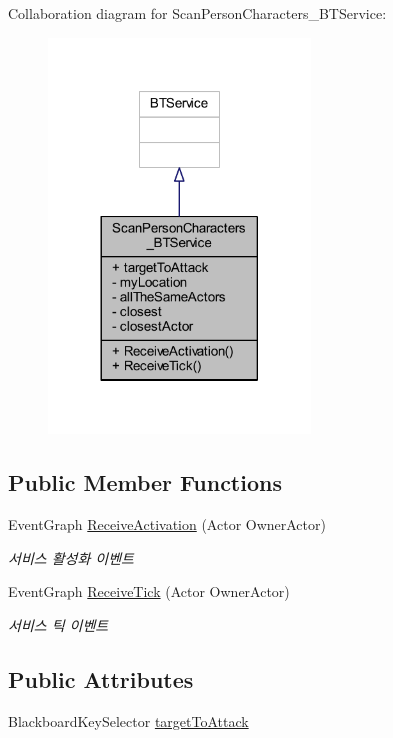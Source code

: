 Collaboration diagram for Scan\+Person\+Characters\+\_\+\+B\+T\+Service\+:
\nopagebreak
\begin{figure}[H]
\begin{center}
\leavevmode
\includegraphics[width=197pt]{class_scan_person_characters___b_t_service__coll__graph}
\end{center}
\end{figure}
\subsection*{Public Member Functions}
\begin{DoxyCompactItemize}
\item 
Event\+Graph \hyperlink{class_scan_person_characters___b_t_service_a90dbc45fd45cc38344f5bd0f6a1cb211}{Receive\+Activation} (Actor Owner\+Actor)
\begin{DoxyCompactList}\small\item\em 서비스 활성화 이벤트 \end{DoxyCompactList}\item 
Event\+Graph \hyperlink{class_scan_person_characters___b_t_service_abc8ccababb4510b7473ad79f67c5f809}{Receive\+Tick} (Actor Owner\+Actor)
\begin{DoxyCompactList}\small\item\em 서비스 틱 이벤트 \end{DoxyCompactList}\end{DoxyCompactItemize}
\subsection*{Public Attributes}
\begin{DoxyCompactItemize}
\item 
Blackboard\+Key\+Selector \hyperlink{class_scan_person_characters___b_t_service_a9c34e715ea6da29e92ca7001672c9115}{target\+To\+Attack}
\end{DoxyCompactItemize}
